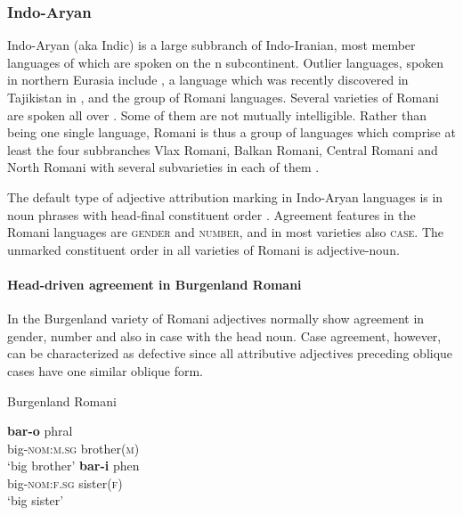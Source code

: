 \subsubsection{Indo-Aryan}
Indo-Aryan (aka Indic) is a large subbranch of Indo-Iranian, most member languages of which are spoken on the n subcontinent. Outlier languages, spoken in northern Eurasia include , a language which was recently discovered in Tajikistan in  \cite[22]{masica1991}, and the group of Romani languages. Several varieties of Romani are spoken all over . Some of them are not mutually intelligible. Rather than being one single language, Romani is thus a group of languages which comprise at least the four subbranches Vlax Romani, Balkan Romani, Central Romani and North Romani with several subvarieties in each of them \citep[2–3]{halwachs-etal2002}.

The default type of adjective attribution marking in Indo-Aryan languages is  in noun phrases with head-final constituent order \cite[369]{masica1991}. Agreement features in the Romani languages are \textsc{gender} and \textsc{number}, and in most varieties also \textsc{case}. The unmarked constituent order in all varieties of Romani is adjective-noun.

\paragraph*{Head\hyp{}driven agreement in Burgenland Romani}
In the Burgenland variety of Romani adjectives normally show agreement in gender, number and also in case with the head noun. Case agreement, however, can be characterized as defective since all attributive adjectives preceding oblique cases have one similar oblique form.
\begin{exe}
\ex \rm{Burgenland Romani \citep[22–23]{halwachs-etal2002}}
\begin{xlist} 
\ex 
\gll	\textbf{bar-o} phral\\
	big-\textsc{nom:m.sg} brother(\textsc{m})\\
\glt	‘big brother’
\ex
\gll	\textbf{bar-i} phen\\
	big-\textsc{nom:f.sg} sister(\textsc{f})\\
\glt	‘big sister’
\end{xlist}
\end{exe}

